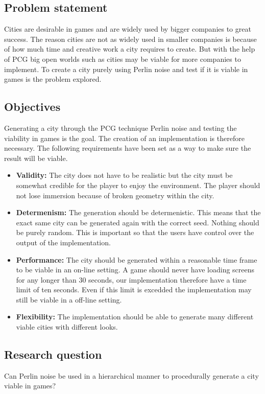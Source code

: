 \subsection{Problem statement}
Cities are desirable in games and are widely used by bigger companies to great success. The reason cities are not as widely used in smaller companies is because of how much time and creative work a city requires to create. But with the help of PCG big open worlds such as cities may be viable for more companies to implement.
To create a city purely using Perlin noise and test if it is viable in games is the problem explored.

\subsection{Objectives}
Generating a city through the PCG technique Perlin noise and testing the viability in games is the goal. The creation of an implementation is therefore necessary.
The following requirements have been set as a way to make sure the result will be viable.
\begin{itemize}
	\item \textbf{Validity:} The city does not have to be realistic but the city must be somewhat credible for the player to enjoy the environment. The player should not lose immersion because of broken geometry within the city.
	
	\item \textbf{Determenism:} The generation should be determenistic. This means that the exact same city can be generated again with the correct seed. Nothing should be purely random. This is important so that the users have control over the output of the implementation.
	
	\item \textbf{Performance:} The city should be generated within a reasonable time frame to be viable in an on-line setting. A game should never have loading screens for any longer than 30 seconds, our implementation therefore have a time limit of ten seconds. Even if this limit is excedded the implementation may still be viable in a off-line setting.
	
	\item \textbf{Flexibility: } The implementation should be able to generate many different viable cities with different looks.
\end{itemize} 

\subsection{Research question}
Can Perlin noise be used in a hierarchical manner to procedurally generate a city viable in games?
\\
